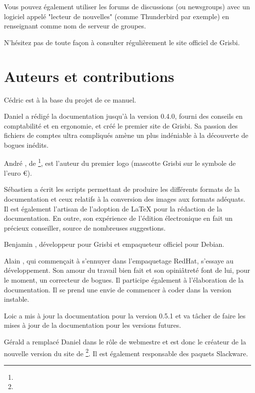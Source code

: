 Vous pouvez également utiliser les forums de discussions (ou newsgroups) avec un logiciel appelé "lecteur de nouvelles" (comme Thunderbird par exemple) en renseignant  comme nom de serveur de groupes.

N'hésitez pas de toute façon à consulter régulièrement le site officiel de Grisbi.



\section{Auteurs et contributions\label{introduction-authors}}		%


Cédric  est à la base du projet de ce manuel.

Daniel  a rédigé la documentation jusqu'à la version 0.4.0, fourni des conseils en comptabilité
et en ergonomie, et créé le premier site de Grisbi. Sa passion des fichiers de
comptes ultra compliqués amène un plus indéniable à la découverte de bogues inédits.

André , de
\footnote{\urlLinuxGraphic{}}, est l'auteur du premier logo (mascotte Grisbi sur le symbole de l'euro €).

Sébastien  a écrit les scripts permettant de produire les différents formats de la documentation et ceux relatifs à la conversion des images aux formats adéquats. Il est également l'artisan de l'adoption de \gls{LaTeX} pour la rédaction de la documentation. En outre, son expérience de l'édition électronique en fait un précieux conseiller, source de nombreuses suggestions.

Benjamin , développeur pour Grisbi et empaqueteur officiel pour \gls{Debian}.

Alain , qui commençait à s'ennuyer dans l'empaquetage \gls{RedHat}, s'essaye au développement. Son amour du travail bien fait et son opiniâtreté font de lui, pour le moment, un correcteur de bogues. Il participe également à l'élaboration de la documentation. Il se prend une envie de commencer à coder dans la version instable.

Loic  a mis à jour la documentation pour la version 0.5.1 et va tâcher de faire les mises à jour de la documentation pour les versions futures.

Gérald  a remplacé
Daniel  dans le rôle de webmestre et est donc le créateur de la nouvelle version du site de \footnote{\urlGrisbi{}}. Il est
également responsable des paquets \gls{Slackware}.

